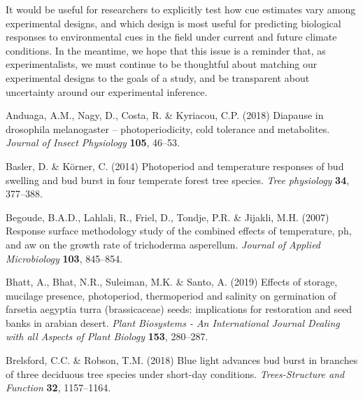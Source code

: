 \documentclass[11pt]{article}
\begin{document}
It would be useful for researchers to explicitly test how cue estimates vary among experimental designs, and which design is most useful for predicting biological responses to environmental cues in the field under current and future climate conditions. In the meantime, we hope that this issue is a reminder that, as experimentalists, we must continue to be thoughtful about matching our experimental designs to the goals of a study, and be transparent about uncertainty around our experimental inference.

%
\begin{thebibliography}{49}
\providecommand{\natexlab}[1]{#1}

Anduaga, A.M., Nagy, D., Costa, R. \& Kyriacou, C.P. (2018) Diapause in
  drosophila melanogaster -- photoperiodicity, cold tolerance and metabolites.
  \emph{Journal of Insect Physiology} \textbf{105}, 46--53.

Basler, D. \& K{\"o}rner, C. (2014) Photoperiod and temperature responses of
  bud swelling and bud burst in four temperate forest tree species. \emph{Tree
  physiology} \textbf{34}, 377--388.

Begoude, B.A.D., Lahlali, R., Friel, D., Tondje, P.R. \& Jijakli, M.H. (2007)
  Response surface methodology study of the combined effects of temperature,
  ph, and aw on the growth rate of trichoderma asperellum. \emph{Journal of
  Applied Microbiology} \textbf{103}, 845--854.

Bhatt, A., Bhat, N.R., Suleiman, M.K. \& Santo, A. (2019) Effects of storage,
  mucilage presence, photoperiod, thermoperiod and salinity on germination of
  farsetia aegyptia turra (brassicaceae) seeds: implications for restoration
  and seed banks in arabian desert. \emph{Plant Biosystems - An International
  Journal Dealing with all Aspects of Plant Biology} \textbf{153}, 280--287.

Brelsford, C.C. \& Robson, T.M. ({2018}) {Blue light advances bud burst in
  branches of three deciduous tree species under short-day conditions}.
  \emph{{Trees-Structure and Function}} \textbf{{32}}, {1157--1164}.


\end{thebibliography}
\end{document}
